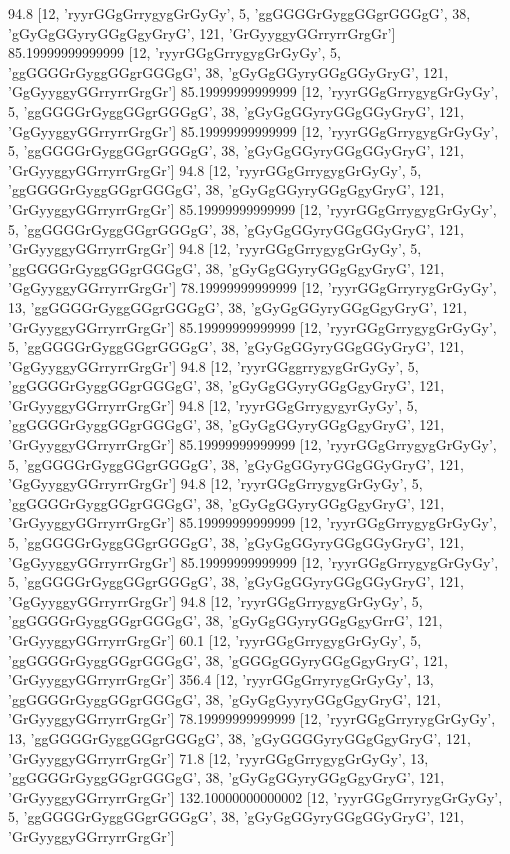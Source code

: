 94.8 [12, 'ryyrGGgGrrygygGrGyGy', 5, 'ggGGGGrGyggGGgrGGGgG', 38, 'gGyGgGGyryGGgGgyGryG', 121, 'GrGyyggyGGrryrrGrgGr']
85.19999999999999 [12, 'ryyrGGgGrrygygGrGyGy', 5, 'ggGGGGrGyggGGgrGGGgG', 38, 'gGyGgGGyryGGgGGyGryG', 121, 'GgGyyggyGGrryrrGrgGr']
85.19999999999999 [12, 'ryyrGGgGrrygygGrGyGy', 5, 'ggGGGGrGyggGGgrGGGgG', 38, 'gGyGgGGyryGGgGGyGryG', 121, 'GgGyyggyGGrryrrGrgGr']
85.19999999999999 [12, 'ryyrGGgGrrygygGrGyGy', 5, 'ggGGGGrGyggGGgrGGGgG', 38, 'gGyGgGGyryGGgGGyGryG', 121, 'GrGyyggyGGrryrrGrgGr']
94.8 [12, 'ryyrGGgGrrygygGrGyGy', 5, 'ggGGGGrGyggGGgrGGGgG', 38, 'gGyGgGGyryGGgGgyGryG', 121, 'GrGyyggyGGrryrrGrgGr']
85.19999999999999 [12, 'ryyrGGgGrrygygGrGyGy', 5, 'ggGGGGrGyggGGgrGGGgG', 38, 'gGyGgGGyryGGgGGyGryG', 121, 'GrGyyggyGGrryrrGrgGr']
94.8 [12, 'ryyrGGgGrrygygGrGyGy', 5, 'ggGGGGrGyggGGgrGGGgG', 38, 'gGyGgGGyryGGgGgyGryG', 121, 'GgGyyggyGGrryrrGrgGr']
78.19999999999999 [12, 'ryyrGGgGrryrygGrGyGy', 13, 'ggGGGGrGyggGGgrGGGgG', 38, 'gGyGgGGyryGGgGgyGryG', 121, 'GrGyyggyGGrryrrGrgGr']
85.19999999999999 [12, 'ryyrGGgGrrygygGrGyGy', 5, 'ggGGGGrGyggGGgrGGGgG', 38, 'gGyGgGGyryGGgGGyGryG', 121, 'GgGyyggyGGrryrrGrgGr']
94.8 [12, 'ryyrGGggrrygygGrGyGy', 5, 'ggGGGGrGyggGGgrGGGgG', 38, 'gGyGgGGyryGGgGgyGryG', 121, 'GrGyyggyGGrryrrGrgGr']
94.8 [12, 'ryyrGGgGrrygygyrGyGy', 5, 'ggGGGGrGyggGGgrGGGgG', 38, 'gGyGgGGyryGGgGgyGryG', 121, 'GrGyyggyGGrryrrGrgGr']
85.19999999999999 [12, 'ryyrGGgGrrygygGrGyGy', 5, 'ggGGGGrGyggGGgrGGGgG', 38, 'gGyGgGGyryGGgGGyGryG', 121, 'GgGyyggyGGrryrrGrgGr']
94.8 [12, 'ryyrGGgGrrygygGrGyGy', 5, 'ggGGGGrGyggGGgrGGGgG', 38, 'gGyGgGGyryGGgGgyGryG', 121, 'GrGyyggyGGrryrrGrgGr']
85.19999999999999 [12, 'ryyrGGgGrrygygGrGyGy', 5, 'ggGGGGrGyggGGgrGGGgG', 38, 'gGyGgGGyryGGgGGyGryG', 121, 'GgGyyggyGGrryrrGrgGr']
85.19999999999999 [12, 'ryyrGGgGrrygygGrGyGy', 5, 'ggGGGGrGyggGGgrGGGgG', 38, 'gGyGgGGyryGGgGGyGryG', 121, 'GgGyyggyGGrryrrGrgGr']
94.8 [12, 'ryyrGGgGrrygygGrGyGy', 5, 'ggGGGGrGyggGGgrGGGgG', 38, 'gGyGgGGyryGGgGgyGrrG', 121, 'GrGyyggyGGrryrrGrgGr']
60.1 [12, 'ryyrGGgGrrygygGrGyGy', 5, 'ggGGGGrGyggGGgrGGGgG', 38, 'gGGGgGGyryGGgGgyGryG', 121, 'GrGyyggyGGrryrrGrgGr']
356.4 [12, 'ryyrGGgGrryrygGrGyGy', 13, 'ggGGGGrGyggGGgrGGGgG', 38, 'gGyGgGyyryGGgGgyGryG', 121, 'GrGyyggyGGrryrrGrgGr']
78.19999999999999 [12, 'ryyrGGgGrryrygGrGyGy', 13, 'ggGGGGrGyggGGgrGGGgG', 38, 'gGyGGGGyryGGgGgyGryG', 121, 'GrGyyggyGGrryrrGrgGr']
71.8 [12, 'ryyrGGgGrrygygGrGyGy', 13, 'ggGGGGrGyggGGgrGGGgG', 38, 'gGyGgGGyryGGgGgyGryG', 121, 'GrGyyggyGGrryrrGrgGr']
132.10000000000002 [12, 'ryyrGGgGrryrygGrGyGy', 5, 'ggGGGGrGyggGGgrGGGgG', 38, 'gGyGgGGyryGGgGGyGryG', 121, 'GrGyyggyGGrryrrGrgGr']
